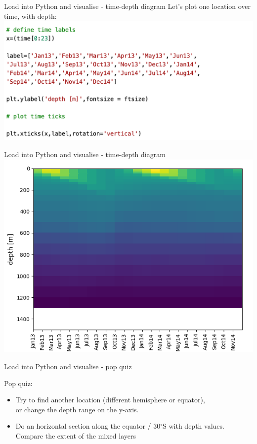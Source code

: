 \begin{frame}{\insertsectionnumber{ |} Load into Python and visualise - time-depth diagram} 
    Let's plot one location over time, with depth: \\
    \hbox{\hspace{-0.5cm}\includegraphics[scale=0.35]{images/Script3_step2.png}}
\end{frame}


\begin{frame}{\insertsectionnumber{ |} Load into Python and visualise - time-depth diagram} 
    \includegraphics[scale=0.45]{images/script1_fig10.png}
\end{frame}


\begin{frame}{\insertsectionnumber{ |} Load into Python and visualise - pop quiz}
    \begin{beamerboxesrounded}[lower=gray,shadow=true]{Pop quiz:\\
        \begin{itemize}
            \item Try to find another location (different hemisphere or equator),\\
            or change the depth range on the y-axis.
            \item Do an horizontal section along the equator / 30$^{\circ}$S with depth values. \\
            Compare the extent of the mixed layers
        \end{itemize}}
    \end{beamerboxesrounded}
\end{frame} 

